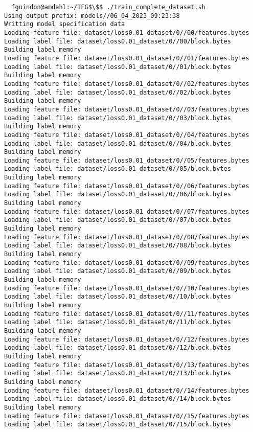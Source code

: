 \documentclass[12pt,oneside]{book}
\begin{document}
\begin{lstlisting}
  fguindon@amdahl:~/TFG$\$$ ./train_complete_dataset.sh
Using output prefix: models//06_04_2023_09:23:38
Writting model specification data
Loading feature file: dataset/loss0.01_dataset/0//00/features.bytes
Loading label file: dataset/loss0.01_dataset/0//00/block.bytes
Building label memory
Loading feature file: dataset/loss0.01_dataset/0//01/features.bytes
Loading label file: dataset/loss0.01_dataset/0//01/block.bytes
Building label memory
Loading feature file: dataset/loss0.01_dataset/0//02/features.bytes
Loading label file: dataset/loss0.01_dataset/0//02/block.bytes
Building label memory
Loading feature file: dataset/loss0.01_dataset/0//03/features.bytes
Loading label file: dataset/loss0.01_dataset/0//03/block.bytes
Building label memory
Loading feature file: dataset/loss0.01_dataset/0//04/features.bytes
Loading label file: dataset/loss0.01_dataset/0//04/block.bytes
Building label memory
Loading feature file: dataset/loss0.01_dataset/0//05/features.bytes
Loading label file: dataset/loss0.01_dataset/0//05/block.bytes
Building label memory
Loading feature file: dataset/loss0.01_dataset/0//06/features.bytes
Loading label file: dataset/loss0.01_dataset/0//06/block.bytes
Building label memory
Loading feature file: dataset/loss0.01_dataset/0//07/features.bytes
Loading label file: dataset/loss0.01_dataset/0//07/block.bytes
Building label memory
Loading feature file: dataset/loss0.01_dataset/0//08/features.bytes
Loading label file: dataset/loss0.01_dataset/0//08/block.bytes
Building label memory
Loading feature file: dataset/loss0.01_dataset/0//09/features.bytes
Loading label file: dataset/loss0.01_dataset/0//09/block.bytes
Building label memory
Loading feature file: dataset/loss0.01_dataset/0//10/features.bytes
Loading label file: dataset/loss0.01_dataset/0//10/block.bytes
Building label memory
Loading feature file: dataset/loss0.01_dataset/0//11/features.bytes
Loading label file: dataset/loss0.01_dataset/0//11/block.bytes
Building label memory
Loading feature file: dataset/loss0.01_dataset/0//12/features.bytes
Loading label file: dataset/loss0.01_dataset/0//12/block.bytes
Building label memory
Loading feature file: dataset/loss0.01_dataset/0//13/features.bytes
Loading label file: dataset/loss0.01_dataset/0//13/block.bytes
Building label memory
Loading feature file: dataset/loss0.01_dataset/0//14/features.bytes
Loading label file: dataset/loss0.01_dataset/0//14/block.bytes
Building label memory
Loading feature file: dataset/loss0.01_dataset/0//15/features.bytes
Loading label file: dataset/loss0.01_dataset/0//15/block.bytes

\end{lstlisting}
\end{document}
